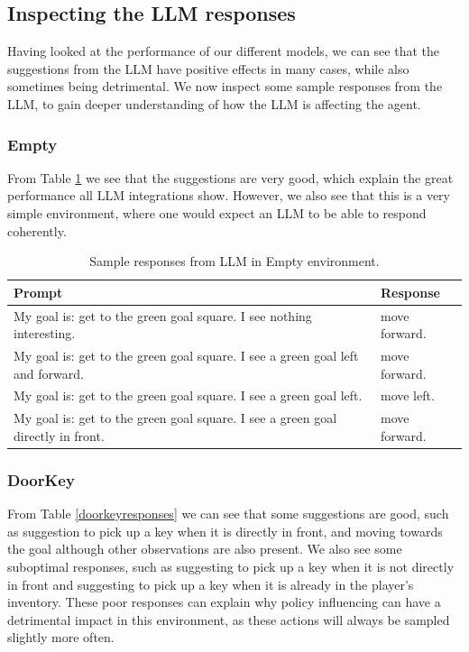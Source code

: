 \documentclass[conference]{IEEEtran}
\begin{document}
\subsection{Inspecting the LLM responses}
\label{llmresponse}

Having looked at the performance of our different models, we can see that the suggestions from the LLM have positive effects in many cases, while also sometimes being detrimental. We now inspect some sample responses from the LLM, to gain deeper understanding of how the LLM is affecting the agent.

\subsubsection{Empty}

From Table \ref{emptyresponses} we see that the suggestions are very good, which explain the great performance all LLM integrations show. However, we also see that this is a very simple environment, where one would expect an LLM to be able to respond coherently.

\begin{table}[h]
\caption{Sample responses from LLM in Empty environment.}
\begin{center}
\label{emptyresponses}
\begin{tabularx}{3.25in}{X | X}
Prompt & Response \\
\hline
My goal is: get to the green goal square. I see nothing interesting. & move forward. \\
My goal is: get to the green goal square. I see a green goal left and forward. & move forward. \\
My goal is: get to the green goal square. I see a green goal left. & move left. \\
My goal is: get to the green goal square. I see a green goal directly in front. & move forward.
\end{tabularx}
\end{center}
\end{table}

\subsubsection{DoorKey}

From Table \ref{doorkeyresponses} we can see that some suggestions are good, such as suggestion to pick up a key when it is directly in front, and moving towards the goal although other observations are also present. We also see some suboptimal responses, such as suggesting to pick up a key when it is not directly in front and suggesting to pick up a key when it is already in the player's inventory. These poor responses can explain why policy influencing can have a detrimental impact in this environment, as these actions will always be sampled slightly more often.
\end{document}
